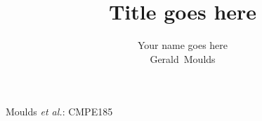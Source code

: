 \documentclass[12pt,journal,compsoc]{IEEEtran}
\begin{document}

\title{Title goes here}
\author{Your name goes here\\
		Gerald~Moulds}

\date{}		%

%
{Moulds \MakeLowercase{\textit{et al.}}: CMPE185}
% 

\end{document}
